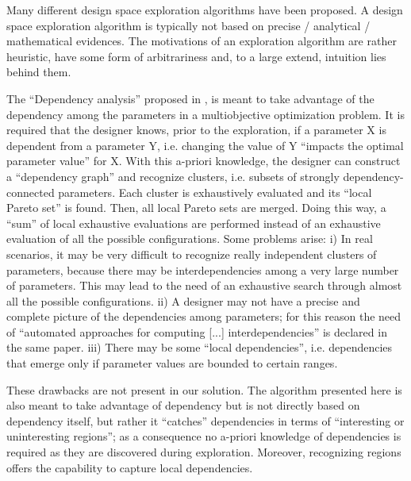Many different design space exploration algorithms have been proposed.
A design space exploration algorithm is typically not based on precise
/ analytical / mathematical evidences. The motivations of an exploration
algorithm are rather heuristic, have some form of arbitrariness and,
to a large extend, intuition lies behind them.

The ``Dependency analysis'' proposed in \cite{givargis_tvlsi02}, is meant
to take advantage of the dependency among the parameters in a multiobjective
optimization problem. It is required that the designer knows, prior
to the exploration, if a parameter X is dependent from a parameter
Y, i.e. changing the value of Y ``impacts the optimal parameter value''
for X. With this a-priori knowledge, the designer can construct a
``dependency graph'' and recognize clusters, i.e. subsets of strongly
dependency-connected parameters. Each cluster is exhaustively evaluated
and its ``local Pareto set'' is found. Then, all local Pareto sets
are merged. Doing this way, a ``sum'' of local exhaustive evaluations
are performed instead of an exhaustive evaluation of all the possible
configurations. Some problems arise: i) In real scenarios, it may
be very difficult to recognize really independent clusters of parameters,
because there may be interdependencies among a very large number of
parameters. This may lead to the need of an exhaustive search through
almost all the possible configurations. ii) A designer may not have
a precise and complete picture of the dependencies among parameters;
for this reason the need of ``automated approaches for computing
{[}...{]} interdependencies'' is declared in the same paper. iii)
There may be some ``local dependencies'', i.e. dependencies that
emerge only if parameter values are bounded to certain ranges.

These drawbacks are not present in our solution. The algorithm presented
here is also meant to take advantage of dependency but is not directly
based on dependency itself, but rather it ``catches'' dependencies
in terms of ``interesting or uninteresting regions''; as a consequence
no a-priori knowledge of dependencies is required as they are discovered
during exploration. Moreover, recognizing regions offers the capability
to capture local dependencies.

